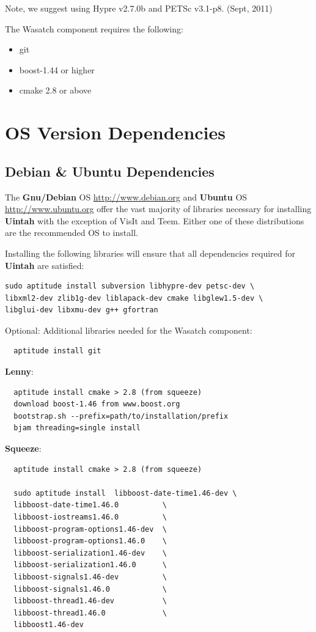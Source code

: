 \documentclass[12pt]{article}
\begin{document}
Note, we suggest using Hypre v2.7.0b and PETSc v3.1-p8.  (Sept, 2011)

The Wasatch component requires the following:
\begin{itemize}
  \item git
  \item boost-1.44 or higher
  \item cmake 2.8 or above
\end{itemize}
\section{OS Version Dependencies}

\subsection{Debian \& Ubuntu Dependencies}
\label{sec:debian_dependencies}
The \textbf{Gnu/Debian} OS \url{http://www.debian.org} and
\textbf{Ubuntu} OS \url{http://www.ubuntu.org} offer the vast majority
of libraries necessary for installing \textbf{Uintah} with the
exception of VisIt and Teem.  Either one of these distributions are
the recommended OS to install.

Installing the following libraries will ensure that all dependencies
required for \textbf{Uintah} are satisfied: 

\begin{verbatim} 
sudo aptitude install subversion libhypre-dev petsc-dev \ 
libxml2-dev zlib1g-dev liblapack-dev cmake libglew1.5-dev \
libglui-dev libxmu-dev g++ gfortran
\end{verbatim}

\noindent Optional: Additional libraries needed for the Wasatch component:
\begin{verbatim}
  aptitude install git
\end{verbatim}  
 \hspace{0.125in} \textbf{Lenny}:
\begin{verbatim}
  aptitude install cmake > 2.8 (from squeeze)
  download boost-1.46 from www.boost.org
  bootstrap.sh --prefix=path/to/installation/prefix
  bjam threading=single install
\end{verbatim}
\hspace{0.125in} \textbf{Squeeze}:
\begin{verbatim}
  aptitude install cmake > 2.8 (from squeeze)
  
  sudo aptitude install  libboost-date-time1.46-dev \
  libboost-date-time1.46.0          \
  libboost-iostreams1.46.0          \   
  libboost-program-options1.46-dev  \
  libboost-program-options1.46.0    \
  libboost-serialization1.46-dev    \
  libboost-serialization1.46.0      \
  libboost-signals1.46-dev          \
  libboost-signals1.46.0            \
  libboost-thread1.46-dev           \
  libboost-thread1.46.0             \
  libboost1.46-dev
\end{verbatim}
\end{document}
